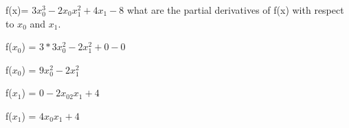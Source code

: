 \documentclass[11pt]{article}
\begin{document}
f(x)= $3x_0^3-2x_0x_1^2+4x_1-8$ what are the partial derivatives of f(x) with respect to $x_0$ and $x_1$.

f($x_0$) = $3*3x_0^2-2x_1^2+0-0$

f($x_0$) = $9x_0^2-2x_1^2$

f($x_1$) = $0-2x_02x_1+4$

f($x_1$) = $4x_0x_1+4$
\end{document}
